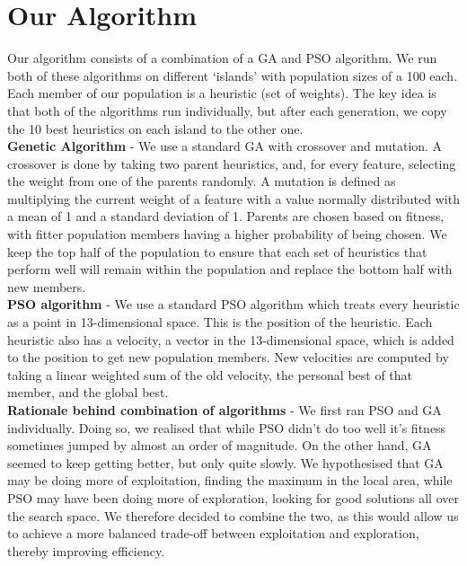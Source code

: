 \documentclass[12pt]{article}
\begin{document}
	\vspace{-0.3cm}
    \section{Our Algorithm}
	\vspace{-0.2cm}

    Our algorithm consists of a combination of a GA and PSO algorithm. We run both of these algorithms on different ‘islands’
	with population sizes of a 100 each. Each member of our population is a heuristic (set of weights).
	The key idea is that both of the algorithms run individually, but after each generation, we
	copy the 10 best heuristics on each island to the other one.\\

	\textbf{Genetic Algorithm} -
	We use a standard GA with crossover and mutation. A crossover is
	done by taking two parent heuristics, and,
	for every feature, selecting the weight from one of the parents randomly. A
	mutation is defined as multiplying the current weight of a feature with
	a value normally distributed with a mean of 1 and a standard deviation of 1. Parents are chosen based on fitness, with fitter population members having a higher
	probability of being chosen. We keep the top half of the population to ensure that each set of heuristics
	that perform well will remain within the population and replace the bottom half with
	new members.\\

	\textbf{PSO algorithm} -
	We use a standard PSO algorithm which treats every heuristic as a point in 13-dimensional space.
	This is the position of the heuristic. Each heuristic also has a velocity,
	a vector in the 13-dimensional space, which is added to the position to get
	new population members. New velocities are computed by taking a linear weighted
	sum of the old velocity, the personal best of that member, and the global best.\\

	\textbf{Rationale behind combination of algorithms} -
	We first ran PSO and GA individually. Doing so, we realised that while PSO didn't do too well
	it's fitness sometimes jumped by almost an order of magnitude.
	On the other hand, GA seemed to keep getting
	better, but only quite slowly. We hypothesised
	that GA may be doing more of exploitation, finding the maximum in the local area,
	while PSO may have been doing more of exploration, looking for good solutions all over
	the search space. We therefore decided to combine the two, as this
	would allow us to achieve a more balanced trade-off between exploitation
	and exploration, thereby improving efficiency.
\end{document}
